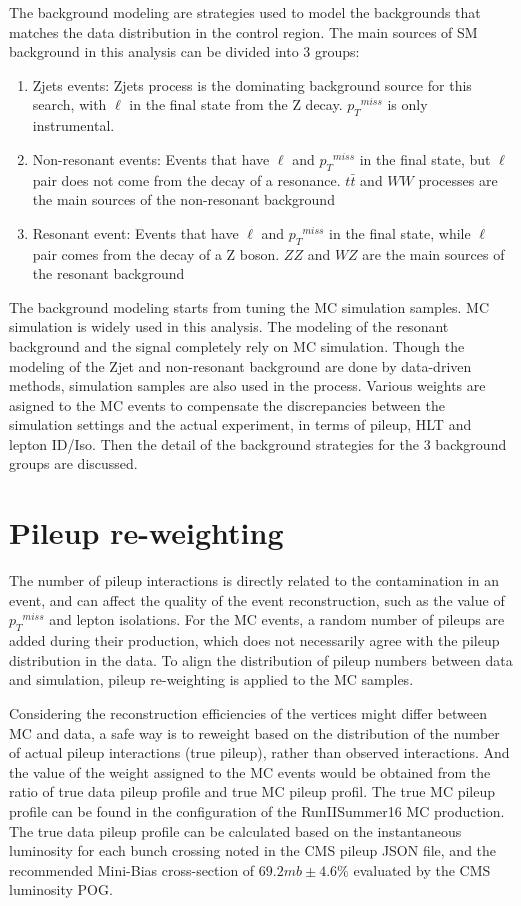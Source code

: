 The background modeling are strategies used to model the backgrounds that matches the data distribution in the control region. The main sources of SM background in this analysis can be divided into 3 groups:
\begin{enumerate}
\item Zjets events: Zjets process is the dominating background source for this search, with $\ell$ in the final state from the Z decay. ${p_{T}}^{miss}$ is only instrumental.
\item Non-resonant events: Events that have $\ell$ and ${p_{T}}^{miss}$ in the final state, but $\ell$ pair does not come from the decay of a resonance. $t\bar{t}$ and $WW$ processes are the main sources of the non-resonant background
\item Resonant event: Events that have $\ell$ and ${p_{T}}^{miss}$ in the final state, while $\ell$ pair comes from the decay of a Z boson. $ZZ$ and $WZ$ are the main sources of the resonant background
\end{enumerate}

\vspace{0.3cm}
The background modeling starts from tuning the MC simulation samples. MC simulation is widely used in this analysis. The modeling of the resonant background and the signal completely rely on MC simulation. Though the modeling of the Zjet and non-resonant background are done by data-driven methods, simulation samples are also used in the process. Various weights are asigned to the MC events to compensate the discrepancies between the simulation settings and the actual experiment, in terms of pileup, HLT and lepton ID/Iso. Then the detail of the background strategies for the 3 background groups are discussed.

\section{Pileup re-weighting}
The number of pileup interactions is directly related to the contamination in an event, and can affect the quality of the event reconstruction, such as the value of ${p_{T}}^{miss}$ and lepton isolations. For the MC events, a random number of pileups are added during their production, which does not necessarily agree with the pileup distribution in the data. To align the distribution of pileup numbers between data and simulation, pileup re-weighting is applied to the MC samples. 

\vspace{0.3cm}
Considering the reconstruction efficiencies of the vertices might differ between MC and data, a safe way is to reweight based on the distribution of the number of actual pileup interactions (true pileup), rather than observed interactions. And the value of the weight assigned to the MC events would be obtained from the ratio of true data pileup profile and true MC pileup profil. The true MC pileup profile can be found in the configuration of the RunIISummer16 MC production. The true data pileup profile can be calculated based on the instantaneous luminosity for each bunch crossing noted in the CMS pileup JSON file, and the recommended Mini-Bias cross-section of $69.2 mb \pm 4.6\%$ evaluated by the CMS luminosity POG.

